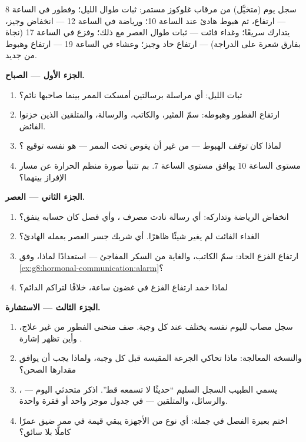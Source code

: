 \begin{problem}\label{pb:g8:hormonal-communication:1}
سجل يوم (متخيَّل) من مرقاب غلوكوز مستمر: ثبات طوال
الليل؛ وفطور في الساعة 8 --- ارتفاع، ثم هبوط هادئ عند
الساعة 10؛ ورياضة في الساعة 12 --- انخفاض وجيز، يتدارك
سريعًا؛ وغداء فائت --- ثبات طوال العصر مع ذلك؛ وفزع في
الساعة 17 (نجاة بفارق شعرة على الدراجة) --- ارتفاع حاد
وجيز؛ وعشاء في الساعة 19 --- ارتفاع وهبوط من جديد.

\medskip\noindent\textbf{الجزء الأول --- الصباح.}
\begin{enumerate}
  \item ثبات الليل: أي مراسلة برسالتين أمسكت الممر
        بينما صاحبها نائم؟
  \item ارتفاع الفطور وهبوطه: سمّ المثير، والكاتب،
        والرسالة، والمتلقين الذين خزنوا الفائض.
  \item لماذا كان \emph{توقف} الهبوط --- من غير أن يغوص
        تحت الممر --- هو نفسه توقيع ؟
  \item مستوى الساعة 10 يوافق مستوى الساعة 7. بم تتنبأ
        صورة منظم الحرارة عن مسار الإفراز بينهما؟
\end{enumerate}

\medskip\noindent\textbf{الجزء الثاني --- العصر.}
\begin{enumerate}[resume]
  \item انخفاض الرياضة وتداركه: أي رسالة نادت مصرف
        ، وأي فصل كان حسابه ينفق؟
  \item الغداء الفائت لم يغير شيئًا ظاهرًا. أي 
        شريك جسر العصر بعمله الهادئ؟
  \item ارتفاع الفزع الحاد: سمّ الكاتب، والغاية من
        السكر المفاجئ --- استعدادًا لماذا، وفق
        \cref{ex:g8:hormonal-communication:alarm}؟
  \item لماذا خمد ارتفاع الفزع في غضون ساعة، خلافًا
        لتراكم  الدائم؟
\end{enumerate}

\medskip\noindent\textbf{الجزء الثالث --- الاستشارة.}
\begin{enumerate}[resume]
  \item سجل مصاب  لليوم نفسه يختلف عند كل وجبة.
        صف منحنى الفطور من غير علاج، وأين تظهر إشارة
        .
  \item والنسخة المعالجة: ماذا تحاكي الجرعة المقيسة قبل
        كل وجبة، ولماذا يجب أن يوافق مقدارها الصحن؟
  \item يسمي الطبيب السجل السليم ``حديثًا لا تسمعه
        قط''. اذكر متحدثي اليوم --- ، والرسائل،
        والمتلقين --- في جدول موجز واحد أو فقرة واحدة.
  \item اختم بعبرة الفصل في جملة: أي نوع من الأجهزة
        يبقي قيمة في ممر ضيق عمرًا كاملًا بلا سائق؟
\end{enumerate}
\end{problem}
